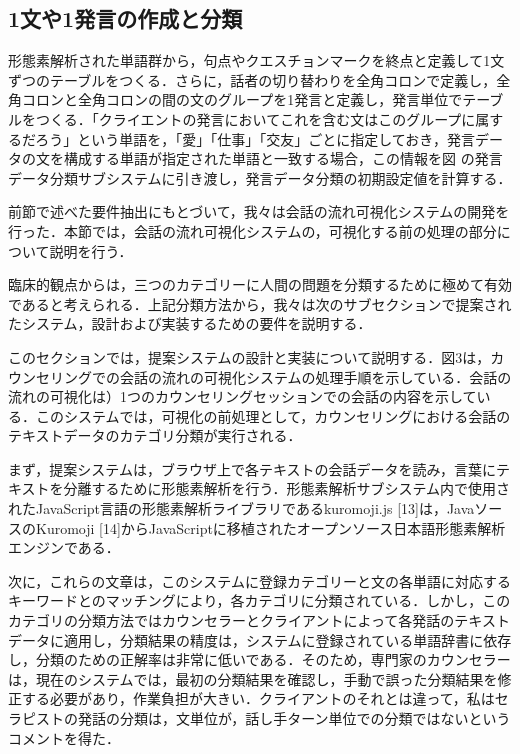 \documentclass[shuuron]{kuee}
\begin{document}
\subsection{1文や1発言の作成と分類}%
形態素解析された単語群から，句点やクエスチョンマークを終点と定義して1文ずつのテーブルをつくる．さらに，話者の切り替わりを全角コロンで定義し，全角コロンと全角コロンの間の文のグループを1発言と定義し，発言単位でテーブルをつくる．「クライエントの発言においてこれを含む文はこのグループに属するだろう」という単語を，「愛」「仕事」「交友」ごとに指定しておき，発言データの文を構成する単語が指定された単語と一致する場合，この情報を図
の発言データ分類サブシステムに引き渡し，発言データ分類の初期設定値を計算する．


前節で述べた要件抽出にもとづいて，我々は会話の流れ可視化システムの開発を行った．本節では，会話の流れ可視化システムの，可視化する前の処理の部分について説明を行う．


臨床的観点からは，三つのカテゴリーに人間の問題を分類するために極めて有効であると考えられる．上記分類方法から，我々は次のサブセクションで提案されたシステム，設計および実装するための要件を説明する．


このセクションでは，提案システムの設計と実装について説明する．図3は，カウンセリングでの会話の流れの可視化システムの処理手順を示している．会話の流れの可視化は）1つのカウンセリングセッションでの会話の内容を示している．このシステムでは，可視化の前処理として，カウンセリングにおける会話のテキストデータのカテゴリ分類が実行される．


まず，提案システムは，ブラウザ上で各テキストの会話データを読み，言葉にテキストを分離するために形態素解析を行う．形態素解析サブシステム内で使用されたJavaScript言語の形態素解析ライブラリであるkuromoji.js [13]は，JavaソースのKuromoji [14]からJavaScriptに移植されたオープンソース日本語形態素解析エンジンである．

次に，これらの文章は，このシステムに登録カテゴリーと文の各単語に対応するキーワードとのマッチングにより，各カテゴリに分類されている．しかし，このカテゴリの分類方法ではカウンセラーとクライアントによって各発話のテキストデータに適用し，分類結果の精度は，システムに登録されている単語辞書に依存し，分類のための正解率は非常に低いである．そのため，専門家のカウンセラーは，現在のシステムでは，最初の分類結果を確認し，手動で誤った分類結果を修正する必要があり，作業負担が大きい．クライアントのそれとは違って，私はセラピストの発話の分類は，文単位が，話し手ターン単位での分類ではないというコメントを得た．
\end{document}
